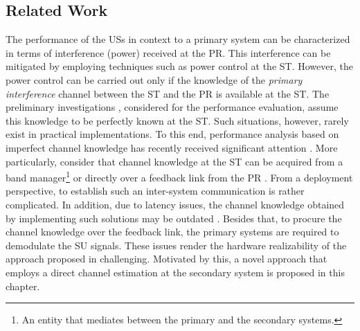 \subsection{Related Work}
The performance of the USs in context to a primary system can be characterized in terms of interference (power) received at the PR. This interference can be mitigated by employing techniques such as power control at the ST. However, the power control can be carried out only if the knowledge of the \textit{primary interference} channel between the ST and the PR is available at the ST. The preliminary investigations \cite{Xing07, Ghasemi07, Kang09}, considered for the performance evaluation, assume this knowledge to be perfectly known at the ST. Such situations, however, rarely exist in practical implementations. To this end, performance analysis based on imperfect channel knowledge has recently received significant attention \cite{Musa09, Suraweera10, Kim12, Sharma15}. More particularly, \cite{Musa09, Suraweera10, Kim12} consider that channel knowledge at the ST can be acquired from a band manager\footnote{An entity that mediates between the primary and the secondary systems.} \cite{Peha05} or directly over a feedback link from the PR \cite{Zhang08}. From a deployment perspective, to establish such an inter-system communication is rather complicated. In addition, due to latency issues, the channel knowledge obtained by implementing such solutions may be outdated \cite{Suraweera10, Kim12}. Besides that, to procure the channel knowledge over the feedback link, the primary systems are required to demodulate the SU signals. These issues render the hardware realizability of the approach proposed in \cite{Musa09, Suraweera10, Kim12} challenging. Motivated by this, a novel approach that employs a direct channel estimation at the secondary system is proposed in this chapter. 

